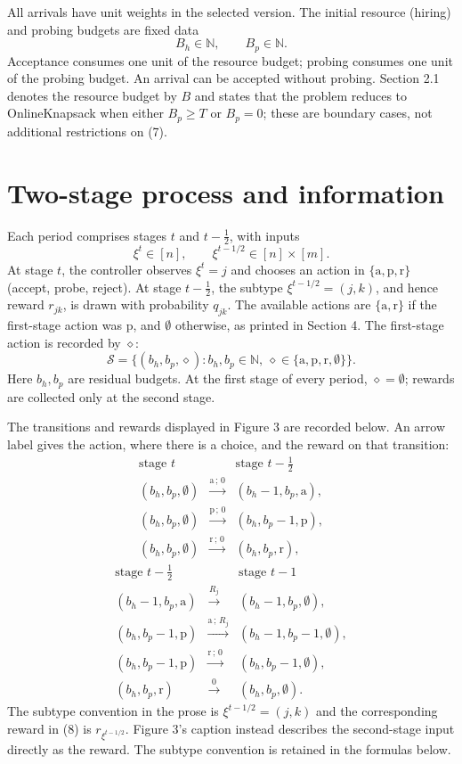 \documentclass{article}
\begin{document}
All arrivals have unit weights in the selected version. The initial resource (hiring) and probing budgets are fixed data
\[
B_h\in\mathbb N,\qquad B_p\in\mathbb N.
\]
Acceptance consumes one unit of the resource budget; probing consumes one unit of the probing budget. An arrival can be accepted without probing. Section 2.1 denotes the resource budget by $B$ and states that the problem reduces to OnlineKnapsack when either $B_p\ge T$ or $B_p=0$; these are boundary cases, not additional restrictions on (7).

\section*{Two-stage process and information}
Each period comprises stages $t$ and $t-\tfrac12$, with inputs
\[
\xi^t\in[n],\qquad
\xi^{t-1/2}\in[n]\times[m].
\]
At stage $t$, the controller observes $\xi^t=j$ and chooses an action in $\{\mathrm a,\mathrm p,\mathrm r\}$ (accept, probe, reject). At stage $t-\tfrac12$, the subtype $\xi^{t-1/2}=(j,k)$, and hence reward $r_{jk}$, is drawn with probability $q_{jk}$. The available actions are $\{\mathrm a,\mathrm r\}$ if the first-stage action was $\mathrm p$, and $\emptyset$ otherwise, as printed in Section 4. The first-stage action is recorded by $\diamond$:
\[
\mathcal S=\{(b_h,b_p,\diamond):b_h,b_p\in\mathbb N,
\ \diamond\in\{\mathrm a,\mathrm p,\mathrm r,\emptyset\}\}.
\]
Here $b_h,b_p$ are residual budgets. At the first stage of every period, $\diamond=\emptyset$; rewards are collected only at the second stage.

The transitions and rewards displayed in Figure 3 are recorded below. An arrow label gives the action, where there is a choice, and the reward on that transition:
\[
\begin{array}{ccl}
\text{stage }t&&\text{stage }t-\tfrac12\\[2pt]
(b_h,b_p,\emptyset)&\xrightarrow{\mathrm a\,;\,0}&(b_h-1,b_p,\mathrm a),\\
(b_h,b_p,\emptyset)&\xrightarrow{\mathrm p\,;\,0}&(b_h,b_p-1,\mathrm p),\\
(b_h,b_p,\emptyset)&\xrightarrow{\mathrm r\,;\,0}&(b_h,b_p,\mathrm r),
\end{array}
\]
\[
\begin{array}{ccl}
\text{stage }t-\tfrac12&&\text{stage }t-1\\[2pt]
(b_h-1,b_p,\mathrm a)&\xrightarrow{R_j}&(b_h-1,b_p,\emptyset),\\
(b_h,b_p-1,\mathrm p)&\xrightarrow{\mathrm a\,;\,R_j}&(b_h-1,b_p-1,\emptyset),\\
(b_h,b_p-1,\mathrm p)&\xrightarrow{\mathrm r\,;\,0}&(b_h,b_p-1,\emptyset),\\
(b_h,b_p,\mathrm r)&\xrightarrow{0}&(b_h,b_p,\emptyset).
\end{array}
\]
The subtype convention in the prose is $\xi^{t-1/2}=(j,k)$ and the corresponding reward in (8) is $r_{\xi^{t-1/2}}$. Figure 3's caption instead describes the second-stage input directly as the reward. The subtype convention is retained in the formulas below.
\end{document}
